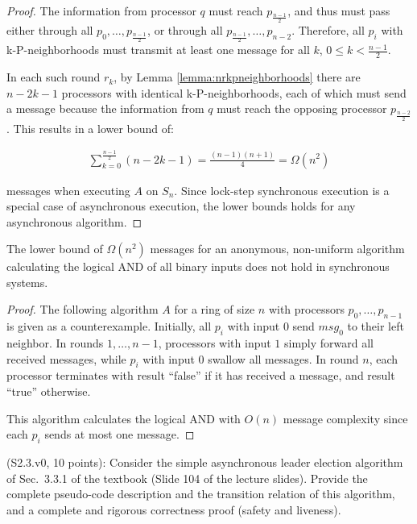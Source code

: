 \begin{proof}
The information from processor $q$ must reach $p_{\frac{n-1}{2}}$, and thus must 
pass either through all $p_0, \ldots, p_{\frac{n-1}{2}}$, or through all
$p_{\frac{n-1}{2}}, \ldots, p_{n-2}$. Therefore, all $p_i$ with k-P-neighborhoods
must transmit at least one message for all $k$, $0 \leq k < \frac{n-1}{2}$.

In each such round $r_k$, by Lemma \ref{lemma:nrkpneighborhoods}
there are $n-2k-1$ processors with identical k-P-neighborhoods, each of which
must send a message because the information from $q$ must reach the opposing processor
$p_{\frac{n-2}{2}}$. This results in a lower bound of:

\begin{align}
\sum_{k = 0}^{\frac{n-1}{2}} (n-2k-1) = \frac{(n-1)(n+1)}{4} = \Omega(n^2)
\end{align}

messages when executing $A$ on $S_n$. Since lock-step synchronous execution
is a special case of asynchronous execution, the lower bounds holds for
any asynchronous algorithm.
\end{proof}


\begin{theorem}
The lower bound of $\Omega(n^2)$ messages for an anonymous, non-uniform algorithm calculating the
logical AND of all binary inputs does not hold in synchronous systems.
\end{theorem}

\begin{proof}
The following algorithm $A$ for a ring of size $n$ with processors $p_0, \ldots, p_{n-1}$
is given as a counterexample. 
Initially, all $p_i$ with input $0$ send $msg_0$ to their
left neighbor.
In rounds $1, \ldots, n-1$, processors with input $1$ simply forward all received
messages, while $p_i$ with input $0$ swallow all messages. In round $n$,
each processor terminates with result ``false'' if it has received a message, and
result ``true'' otherwise.

This algorithm calculates the logical AND with $O(n)$ message complexity since
each $p_i$ sends at most one message.
\end{proof}


\begin{Exc}{(S2.3.v0, 10 points):}
Consider the simple asynchronous leader election algorithm of Sec.~3.3.1 of
the textbook (Slide 104 of the lecture slides). Provide the complete
pseudo-code description and the transition relation of this algorithm,
and a complete and rigorous correctness proof (safety and liveness).
\end{Exc}

